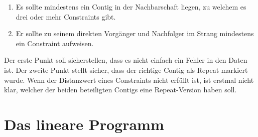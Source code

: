 \begin{enumerate}
	\item Es sollte mindestens ein Contig in der Nachbarschaft liegen, zu welchem es drei oder mehr Constraints gibt.
	\item Er sollte zu seinem direkten Vorgänger und Nachfolger im Strang mindestens ein Constraint aufweisen.
\end{enumerate}
Der erste Punkt soll sicherstellen, dass es nicht einfach ein Fehler in den Daten ist. Der zweite Punkt stellt sicher, dass der richtige Contig als Repeat markiert wurde. Wenn der Distanzwert eines Constraints nicht erfüllt ist, ist erstmal nicht klar, welcher der beiden beteiligten Contigs eine Repeat-Version haben soll.

\chapter{Das lineare Programm}
